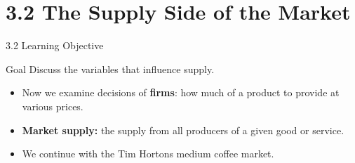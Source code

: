\documentclass[aspectratio=169]{beamer}
\begin{document}
\section{3.2 The Supply Side of the Market}

\begin{frame}{3.2 Learning Objective}
\transfade
\begin{block}{Goal}
Discuss the variables that influence supply.
\end{block}
\begin{itemize}[<+->]
  \item Now we examine decisions of \textbf{firms}: how much of a product to provide at various prices.
  \item \textbf{Market supply:} the supply from all producers of a given good or service.
  \item We continue with the Tim Hortons medium coffee market.
\end{itemize}
\end{frame}
\end{document}

